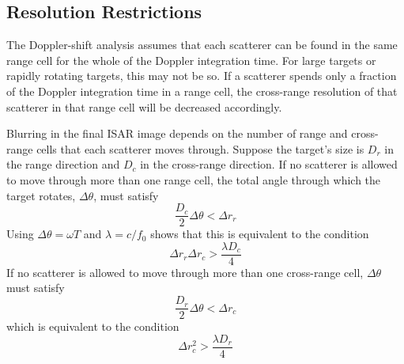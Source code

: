 \subsection{Resolution Restrictions}
\label{ii sec:dop rr}

The Doppler-shift analysis assumes that each scatterer can be found in the
same range cell for the whole of the Doppler integration time.  For large
targets or rapidly rotating targets, this may not be so.  If a scatterer
spends only a fraction of the Doppler integration time in a range cell, the
cross-range resolution of that scatterer in that range cell will be
decreased accordingly.  

Blurring in the final ISAR image depends on the number of range and
cross-range cells that each scatterer moves through.  Suppose the target's
size is $D_r$ in the range direction and $D_c$ in the cross-range direction.
If no scatterer is allowed to move through more than one range cell, the
total angle through which the target rotates, $\Delta\theta$, must satisfy
\begin{equation}
\frac{D_c}{2}\Delta\theta<\Delta r_r
\end{equation}
Using $\Delta\theta=\omega T$ and $\lambda=c/f_0$ shows that this is 
equivalent to the condition
\begin{equation}
\Delta r_r\Delta r_c>\frac{\lambda D_c}{4}
\end{equation}
If no scatterer is allowed to move through more than one cross-range cell, 
$\Delta\theta$ must satisfy
\begin{equation}\label{ii eqn:prc I}
\frac{D_r}{2}\Delta\theta<\Delta r_c
\end{equation}
which is equivalent to the condition
\begin{equation}\label{ii eqn:prc II}
\Delta r_c^2>\frac{\lambda D_r}{4}
\end{equation}

